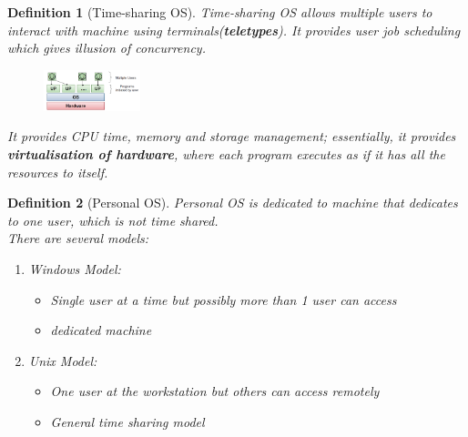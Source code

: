 \documentclass[11pt]{article}
\newtheorem{definition}{Definition}[section]
\theoremstyle{definition}
\begin{document}
\begin{definition}[Time-sharing OS]
\normalfont Time-sharing OS allows multiple users to interact with machine using terminals(\textbf{teletypes}). It provides user job scheduling which gives \textit{illusion} of concurrency. \\
\begin{figure}[h]
\centering
\includegraphics[width = 0.25\textwidth]{1_3.png}
\end{figure}
It provides CPU time, memory and storage management; essentially, it provides \textbf{virtualisation of hardware}, where each program executes as if it has all the resources to itself.
\end{definition}
\begin{definition}[Personal OS]
\normalfont Personal OS is dedicated to machine that dedicates to one user, which is not time shared.\\
There are several models:
\begin{enumerate}
  \item Windows Model:
  \begin{itemize}[itemsep=0pt]
    \item Single user at a time but possibly more than 1 user can access
    \item dedicated machine
  \end{itemize}
  \item Unix Model:
  \begin{itemize}[itemsep=0pt]
    \item One user at the workstation but others can access remotely
    \item General time sharing model
  \end{itemize}
\end{enumerate}
\end{definition}
\end{document}
